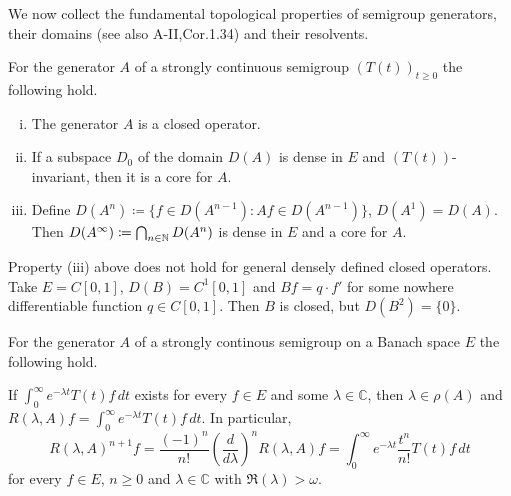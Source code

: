 We now collect the fundamental topological properties of semigroup generators, their domains (see also A-II,Cor.1.34) and their resolvents.
\begin{proposition}\label{prop:a1-1.9}
For the generator $A$ of a strongly continuous semigroup $(T(t))_{t \geq 0}$ the following hold.
\begin{enumerate}[(i)]
\item 
The generator $A$ is a closed operator.

\item
If a subspace $D_{0}$ of the domain $D(A)$ is dense in $E$ and $(T(t))$-invariant, then it is a core for $A$.
\item Define $D(A^{n}) \coloneqq \{f \in D(A^{n-1}) \colon Af \in D(A^{n-1})\}$, $D(A^{1}) = D(A)$.
Then $D(A^{\infty}) \coloneqq \bigcap_{n \in \mathbb{N}} D(A^{n})$ is dense in $E$ and a core for $A$.
\end{enumerate}
\end{proposition}
\begin{example}\label{ex:a1-1.10}
Property (iii) above does not hold for general densely defined closed operators.
Take $E = C\left[ 0,1 \right]$, $D(B) = C^{1}\left[ 0,1 \right]$ and $Bf = q \cdot f'$ for some nowhere differentiable function $q \in C\left[ 0,1 \right]$.
Then $B$ is closed, but $D(B^{2}) = \{0\}$.
\end{example}
\begin{proposition}\label{prop:a1-1.11}
For the generator $A$ of a strongly continous semigroup on a Banach space $E$ the following hold.

If $\int_{0}^{\infty} e^{-\lambda t}T(t)f \, dt$ exists for every $f \in E$ and some $\lambda \in \mathbb{C}$, then $\lambda \in \rho(A)$ and $R(\lambda,A)f = \int_{0}^{\infty} e^{-\lambda t}T(t)f \, dt$.
In particular,
\begin{equation}\label{eq:a1-1.7}
R(\lambda,A)^{n+1}f = \frac{(-1)^{n}}{n!}\left(\frac{d}{d\lambda}\right)^{n} R(\lambda,A)f = \int_{0}^{\infty} e^{-\lambda t}\frac{t^{n}}{n!}T(t)f \, dt
\end{equation}
for every $f \in E$, $n \geq 0$ and $\lambda \in \mathbb{C}$ with $\Re(\lambda) > \omega$.
\end{proposition}
